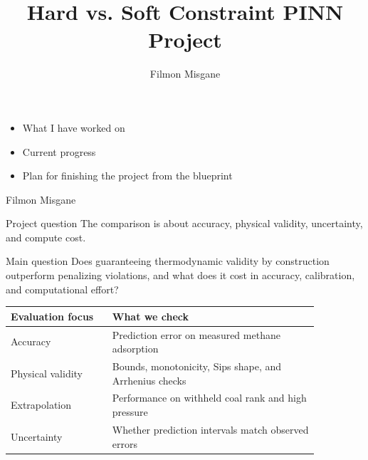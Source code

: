 \documentclass[aspectratio=169,10pt]{beamer}
\title{Hard vs. Soft Constraint PINN Project}
\author{Filmon Misgane}
\date{}
\newcommand{\smallgray}[1]{\textcolor{projectGray}{#1}}
\begin{document}
\begin{frame}[plain]
  \vspace{0.8cm}
  {\inserttitle\par}

  \vspace{0.8cm}
  \begin{itemize}
    \item What I have worked on
    \item Current progress
    \item Plan for finishing the project from the blueprint
  \end{itemize}

  \vfill
  \begin{flushright}
    \smallgray{Filmon Misgane}
  \end{flushright}
\end{frame}

\begin{frame}{Project question}
  \smallgray{The comparison is about accuracy, physical validity, uncertainty, and compute cost.}

  \vspace{0.5cm}
  \begin{block}{Main question}
    Does guaranteeing thermodynamic validity by construction outperform
    penalizing violations, and what does it cost in accuracy, calibration,
    and computational effort?
  \end{block}

  \vspace{0.3cm}
  \begin{table}
    \centering
    \begin{tabular}{p{0.28\linewidth}p{0.58\linewidth}}
      \toprule
      \textbf{Evaluation focus} & \textbf{What we check}                                 \\
      \midrule
      Accuracy                  & Prediction error on measured methane adsorption        \\
      Physical validity         & Bounds, monotonicity, Sips shape, and Arrhenius checks \\
      Extrapolation             & Performance on withheld coal rank and high pressure    \\
      Uncertainty               & Whether prediction intervals match observed errors     \\
      \bottomrule
    \end{tabular}
  \end{table}
\end{frame}
\end{document}
